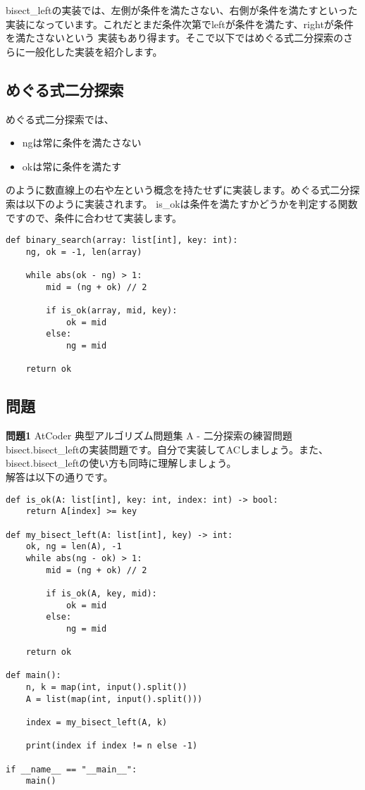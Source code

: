 bisect\_leftの実装では、左側が条件を満たさない、右側が条件を満たすといった実装になっています。これだとまだ条件次第でleftが条件を満たす、rightが条件を満たさないという
実装もあり得ます。そこで以下ではめぐる式二分探索のさらに一般化した実装を紹介します。

\subsection{めぐる式二分探索}

めぐる式二分探索では、

\begin{itemize}
  \item ngは常に条件を満たさない
  \item okは常に条件を満たす
\end{itemize}

のように数直線上の右や左という概念を持たせずに実装します。めぐる式二分探索は以下のように実装されます。
is\_okは条件を満たすかどうかを判定する関数ですので、条件に合わせて実装します。

\begin{lstlisting}[caption=めぐる式二分探索, frame=TRBL, label={megru}]
def binary_search(array: list[int], key: int):
    ng, ok = -1, len(array)
    
    while abs(ok - ng) > 1:
        mid = (ng + ok) // 2
        
        if is_ok(array, mid, key):
            ok = mid
        else:
            ng = mid
    
    return ok
\end{lstlisting}

\subsection{問題}
\textbf{問題1} AtCoder 典型アルゴリズム問題集 A - 二分探索の練習問題
bisect.bisect\_leftの実装問題です。自分で実装してACしましょう。また、bisect.bisect\_leftの使い方も同時に理解しましょう。\\

解答は以下の通りです。

\begin{lstlisting}[caption=問題1, frame=TRBL, label={problem1}]
def is_ok(A: list[int], key: int, index: int) -> bool:
    return A[index] >= key

def my_bisect_left(A: list[int], key) -> int:
    ok, ng = len(A), -1
    while abs(ng - ok) > 1:
        mid = (ng + ok) // 2

        if is_ok(A, key, mid):
            ok = mid
        else:
            ng = mid
    
    return ok

def main():
    n, k = map(int, input().split())
    A = list(map(int, input().split()))
    
    index = my_bisect_left(A, k)
    
    print(index if index != n else -1)

if __name__ == "__main__":
    main()

\end{lstlisting}

